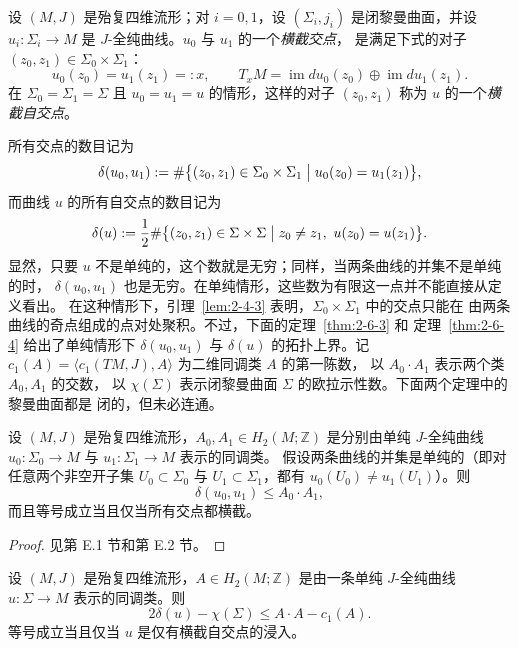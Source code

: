 \begin{definition}\label{def:2-6-2}
设 $(M,J)$ 是殆复四维流形；对 $i=0,1$，设 $(\Sigma_i,j_i)$ 是闭黎曼曲面，并设
$u_i:\Sigma_i\to M$ 是 $J$-全纯曲线。$u_0$ 与 $u_1$ 的一个\emph{横截交点}，
是满足下式的对子 $(z_0,z_1)\in\Sigma_0\times\Sigma_1$：
\begin{equation}\label{eq:2-6-1}
  u_0(z_0)=u_1(z_1)=:x,
  \qquad
  T_xM=\operatorname{im}du_0(z_0)\oplus\operatorname{im}du_1(z_1).
\end{equation}
在 $\Sigma_0=\Sigma_1=\Sigma$ 且 $u_0=u_1=u$ 的情形，这样的对子 $(z_0,z_1)$
称为 $u$ 的一个\emph{横截自交点}。
\end{definition}

所有交点的数目记为
\[
  \delta(u_0,u_1)
  :=\#\bigl\{(z_0,z_1)\in\Sigma_0\times\Sigma_1
  \bigm|u_0(z_0)=u_1(z_1)\bigr\},
\]
而曲线 $u$ 的所有自交点的数目记为
\[
  \delta(u)
  :=\frac12\#\bigl\{(z_0,z_1)\in\Sigma\times\Sigma
  \bigm|z_0\ne z_1,\ u(z_0)=u(z_1)\bigr\}.
\]
显然，只要 $u$ 不是单纯的，这个数就是无穷；同样，当两条曲线的并集不是单纯的时，
$\delta(u_0,u_1)$ 也是无穷。在单纯情形，这些数为有限这一点并不能直接从定义看出。
在这种情形下，引理~\ref{lem:2-4-3} 表明，$\Sigma_0\times\Sigma_1$ 中的交点只能在
由两条曲线的奇点组成的点对处聚积。不过，下面的定理~\ref{thm:2-6-3} 和
定理~\ref{thm:2-6-4}
给出了单纯情形下 $\delta(u_0,u_1)$ 与 $\delta(u)$ 的拓扑上界。记
$c_1(A)=\langle c_1(TM,J),A\rangle$ 为二维同调类 $A$ 的第一陈数，
以 $A_0\cdot A_1$ 表示两个类 $A_0,A_1$ 的交数，
以 $\chi(\Sigma)$ 表示闭黎曼曲面 $\Sigma$ 的欧拉示性数。下面两个定理中的黎曼曲面都是
闭的，但未必连通。

\begin{theorem}\label{thm:2-6-3}
设 $(M,J)$ 是殆复四维流形，$A_0,A_1\in H_2(M;\mathbb Z)$ 是分别由单纯
$J$-全纯曲线 $u_0:\Sigma_0\to M$ 与 $u_1:\Sigma_1\to M$ 表示的同调类。
假设两条曲线的并集是单纯的（即对任意两个非空开子集
$U_0\subset\Sigma_0$ 与 $U_1\subset\Sigma_1$，都有
$u_0(U_0)\ne u_1(U_1)$）。则
\[
  \delta(u_0,u_1)\le A_0\cdot A_1,
\]
而且等号成立当且仅当所有交点都横截。
\end{theorem}

\begin{proof}
见第 E.1 节和第 E.2 节。
\end{proof}

\begin{theorem}\label{thm:2-6-4}
设 $(M,J)$ 是殆复四维流形，$A\in H_2(M;\mathbb Z)$ 是由一条单纯 $J$-全纯曲线
$u:\Sigma\to M$ 表示的同调类。则
\begin{equation}\label{eq:2-6-2}
  2\delta(u)-\chi(\Sigma)\le A\cdot A-c_1(A).
\end{equation}
等号成立当且仅当 $u$ 是仅有横截自交点的浸入。
\end{theorem}

